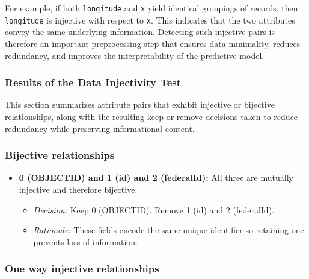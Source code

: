\documentclass{article}
\begin{document}
For example, if both \texttt{longitude} and \texttt{x} yield identical groupings of records, then \texttt{longitude} is injective with respect to \texttt{x}. This indicates that the two attributes convey the same underlying information. Detecting such injective pairs is therefore an important preprocessing step that ensures data minimality, reduces redundancy, and improves the interpretability of the predictive model.

\subsubsection{Results of the Data Injectivity Test}

This section summarizes attribute pairs that exhibit injective or bijective relationships, along with the resulting keep or remove decisions taken to reduce redundancy while preserving informational content.

\subsubsection*{Bijective relationships}

\begin{itemize}
    \item \textbf{0 (OBJECTID) and 1 (id) and 2 (federalId):} All three are mutually injective and therefore bijective. 
    \begin{itemize}
        \item \textit{Decision:} Keep 0 (OBJECTID). Remove 1 (id) and 2 (federalId).
        \item \textit{Rationale:} These fields encode the same unique identifier so retaining one prevents loss of information. 
    \end{itemize}
\end{itemize}

\subsubsection*{One way injective relationships}
\end{document}
